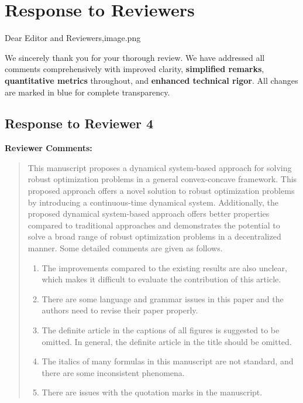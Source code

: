 \documentclass[journal,twoside,web]{ieeecolor}
\begin{document}
\fi  %

\newpage
\section*{Response to Reviewers}

\noindent Dear Editor and Reviewers,image.png

We sincerely thank you for your thorough review. We have addressed all comments comprehensively with improved clarity, \textbf{simplified remarks}, \textbf{quantitative metrics} throughout, and \textbf{enhanced technical rigor}. All changes are marked in {\color{revisionblue}blue} for complete transparency.


\newpage

\subsection*{Response to Reviewer 4}

\noindent\textbf{Reviewer Comments:}

\begin{quote}
This manuscript proposes a dynamical system-based approach for solving robust optimization problems in a general convex-concave framework. This proposed approach offers a novel solution to robust optimization problems by introducing a continuous-time dynamical system. Additionally, the proposed dynamical system-based approach offers better properties compared to traditional approaches and demonstrates the potential to solve a broad range of robust optimization problems in a decentralized manner. Some detailed comments are given as follows.

\begin{enumerate}
\item The improvements compared to the existing results are also unclear, which makes it difficult to evaluate the contribution of this article.

\item There are some language and grammar issues in this paper and the authors need to revise their paper properly.

\item The definite article in the captions of all figures is suggested to be omitted. In general, the definite article in the title should be omitted.

\item The italics of many formulas in this manuscript are not standard, and there are some inconsistent phenomena.

\item There are issues with the quotation marks in the manuscript.
\end{enumerate}
\end{quote}
\end{document}
